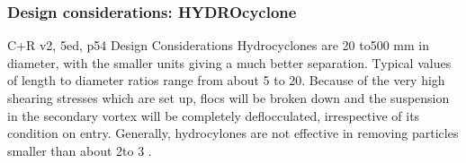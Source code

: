 \begin{frame}\frametitle{Design considerations: HYDROcyclone}
	C+R v2, 5ed, p54
	Design Considerations
	Hydrocyclones are 20 to500 mm in diameter, with the smaller units giving a much better separation. Typical values of length to diameter ratios range from about 5 to 20. Because of the very high shearing stresses which are set up, flocs will be broken down and the suspension in the secondary vortex will be completely deflocculated, irrespective of its condition on entry. Generally, hydrocylones are not effective in removing particles smaller than about 2to 3 \micron.
\end{frame}

